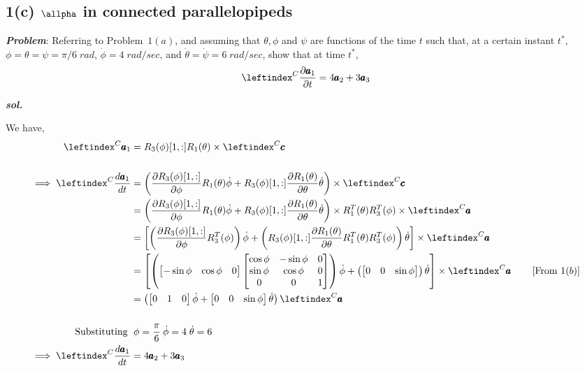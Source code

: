 \subsection{1(c) $\allpha$ in connected parallelopipeds}
\textbf{\textit{Problem}}: Referring to Problem~$1(a)$, and assuming that $\theta, \phi$ and $\psi$ are functions of the time $t$ such that, at a certain instant $t^*$, $\phi = \theta = \psi = \pi/6 \; rad$, $\dot \phi = 4 \; rad/sec$, and $\dot \theta = \dot \psi = 6 \; rad/sec$, show that at time $t^*$,
$$ \lx{^C}{\frac{\partial \pmb a_1}{\partial t}} = 4 \pmb a_2 + 3 \pmb a_3$$

\textbf{\textit{sol.}}

We have,
\begin{align*}
    \lx{^C}{{\pmb a_1}} &= R_3(\phi)[1, :] R_1(\theta) \times \lx{^C}{\pmb c}\\
    \\
    \implies \lx{^C}{\frac{d \pmb a_1}{dt}} &= \left( \frac{\partial R_3(\phi)[1, :]}{\partial \phi}   R_1(\theta) \dot \phi + R_3(\phi)[1, :] \frac{\partial R_1(\theta)}{\partial \theta } \dot \theta \right) \times \lx{^C}{\pmb c}\\
    &= \left( \frac{\partial R_3(\phi)[1, :]}{\partial \phi}   R_1(\theta) \dot \phi + R_3(\phi)[1, :] \frac{\partial R_1(\theta)}{\partial \theta } \dot \theta \right) \times R_1^T(\theta) R_3^T(\phi) \times \lx{^C}{\pmb a}\\
    &= \left[
    \left(\frac{\partial R_3(\phi)[1, :]}{\partial \phi}   R_3^T(\phi)
    \right)\dot \phi +
    \left(R_3(\phi)[1, :] \frac{\partial R_1(\theta)}{\partial \theta } R_1^T(\theta) R_3^T(\phi)
    \right) \dot \theta
    \right]\times \lx{^C}{\pmb a}\\
    &= \left[
    \left(\bm{-\sin \phi & \cos \phi & 0}\bm{
            \cos \phi & -\sin \phi  & 0\\
            \sin \phi & \cos \phi & 0\\
            0          & 0         & 1
        }
    \right)\dot \phi +
    \left(\bm{0 & 0 & \sin \phi}
    \right) \dot \theta
    \right]\times \lx{^C}{\pmb a}
    \qquad \left[\text{From } 1(b) \right]\\
    &= \left( \bm{0&1&0} \dot \phi + \bm{0 & 0 & \sin \phi} \dot \theta \right) \lx{^C}{{\pmb a}}\\
    \\
    \text{Substituting }&\; \phi = \frac{\pi}{6} \: \dot \phi =4 \; \dot \theta = 6\\
    \implies \lx{^C}{\frac{d \pmb a_1}{dt}} &= 4 \pmb a_2 + 3 \pmb a_3
\end{align*}
